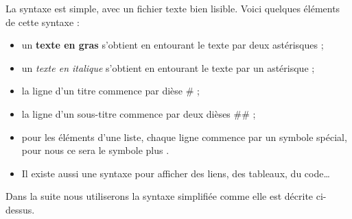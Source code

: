 \documentclass[11pt,class=report,crop=false]{standalone}
\begin{document}
\begin{cours}[Markdown]
La syntaxe est simple, avec un fichier texte bien lisible. Voici quelques éléments de cette syntaxe :
\begin{itemize}
  \item un \textbf{texte en gras} s'obtient en entourant le texte par deux astérisques \ci{**} ;
  \item un \emph{texte en italique} s'obtient en entourant le texte par un astérisque \ci{*} ;
  \item la ligne d'un titre commence par dièse \# ;
  \item la ligne d'un sous-titre commence par deux dièses \#\# ;
  \item pour les éléments d'une liste, chaque ligne commence par un symbole spécial, pour nous ce sera le symbole \og{}plus\fg{} \ci{+}.
  \item Il existe aussi une syntaxe pour afficher des liens, des tableaux, du code\ldots 
\end{itemize}

Dans la suite nous utiliserons la syntaxe simplifiée comme elle est décrite ci-dessus.
\end{cours}

\end{document}

